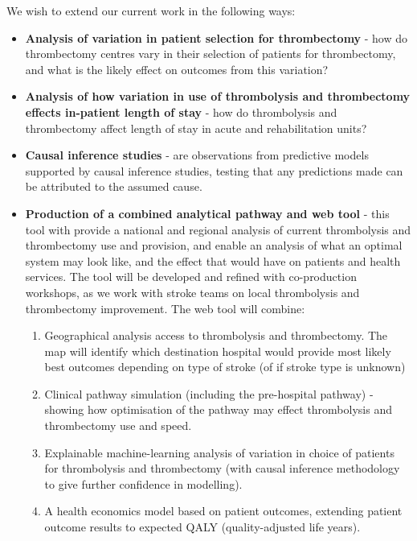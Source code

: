 We wish to extend our current work in the following ways:

\begin{itemize}
    \item \textbf{Analysis of variation in patient selection for thrombectomy} - how do thrombectomy centres vary in their selection of patients for thrombectomy, and what is the likely effect on outcomes from this variation?

    \item \textbf{Analysis of how variation in use of thrombolysis and thrombectomy effects in-patient length of stay} - how do thrombolysis and thrombectomy affect length of stay in acute and rehabilitation units?

    \item \textbf{Causal inference studies} - are observations from predictive models supported by causal inference studies, testing that any predictions made can be attributed to the assumed cause.

    \item \textbf{Production of a combined analytical pathway and web tool} - this tool with provide a national and regional analysis of current thrombolysis and thrombectomy use and provision, and enable an analysis of what an optimal system may look like, and the effect that would have on patients and health services. The tool will be developed and refined with co-production workshops, as we work with stroke teams on local thrombolysis and thrombectomy improvement. The web tool will combine:
    
    \begin{enumerate}
        \item Geographical analysis access to thrombolysis and thrombectomy. The map will identify which destination hospital would provide most likely best outcomes depending on type of stroke (of if stroke type is unknown)

        \item Clinical pathway simulation (including the pre-hospital pathway) - showing how optimisation of the pathway may effect thrombolysis and thrombectomy use and speed.

        \item Explainable machine-learning analysis of variation in choice of patients for thrombolysis and thrombectomy (with causal inference methodology to give further confidence in modelling).

        \item A health economics model based on patient outcomes, extending patient outcome results to expected QALY (quality-adjusted life years).
    \end{enumerate} 
    
\end{itemize}

